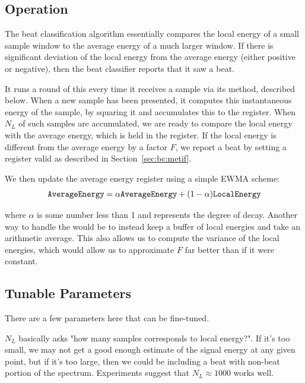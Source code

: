 \documentclass[letterpaper]{article}
\begin{document}
    \subsection{Operation}
        
    The beat classification algorithm essentially compares the local energy of
    a small sample window to the average energy of a much larger window.  If
    there is significant deviation of the local energy from the average energy
    (either positive or negative), then the beat classifier reports that it saw
    a beat.

    It runs a round of this every time it receives a sample via its
     method, described below.  When a new sample has been
    presented, it computes this instantaneous energy of the sample, by squaring
    it and accumulates this to the  register.  When $N_L$ of
    such samples are accumulated, we are ready to compare the local energy with
    the average energy, which is held in the  register.  If
    the local energy is different from the average energy by a factor $F$, we
    report a beat by setting a  register valid as described in
    Section~\ref{sec:bc:metif}.

    We then update the average energy register using a simple EWMA scheme:
    \begin{equation}
        \textrm{\texttt{AverageEnergy}} = \alpha \textrm{\texttt{AverageEnergy}} +
                        (1-\alpha) \textrm{\texttt{LocalEnergy}}
    \end{equation}

    where $\alpha$ is some number less than 1 and represents the degree of
    decay.  Another way to handle the  would be to instead
    keep a buffer of local energies and take an arithmetic average.  This also
    allows us to compute the variance of the local energies, which would allow
    us to approximate $F$ far better than if it were constant.

    
    \subsection{Tunable Parameters}

    There are a few parameters here that can be fine-tuned.

    $N_L$ basically asks "how many samples corresponds to local energy?".  If
    it's too small, we may not get a good enough estimate of the signal energy
    at any given point, but if it's too large, then we could be including a
    beat with non-beat portion of the spectrum.  Experiments suggest that $N_L
    \approx 1000$ works well.
\end{document}

